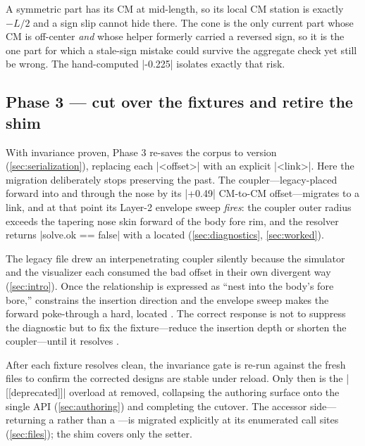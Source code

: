 \begin{keyinsight}
A symmetric part has its CM at mid-length, so its local CM station is exactly $-L/2$ and a sign
slip cannot hide there. The cone is the only current part whose CM is off-center \emph{and} whose
helper formerly carried a reversed sign, so it is the one part for which a stale-sign mistake
could survive the aggregate check yet still be wrong. The hand-computed
\cppinline|-0.225| isolates exactly that risk.
\end{keyinsight}

\subsection{Phase 3 --- cut over the fixtures and retire the shim}

With invariance proven, Phase 3 re-saves the corpus to version 
(\cref{sec:serialization}), replacing each \cppinline|<offset>| with an explicit
\cppinline|<link>|. Here the migration deliberately stops preserving the past. The
 coupler---legacy-placed forward into and through the nose by its
\cppinline|+0.49| CM-to-CM offset---migrates to a  link, and at that
point its Layer-2 envelope sweep \emph{fires}: the coupler outer radius exceeds the
tapering nose skin forward of the body fore rim, and the resolver returns
\cppinline|solve.ok == false| with a located 
(\cref{sec:diagnostics}, \cref{sec:worked}).

\begin{hardfail}
The legacy file drew an interpenetrating coupler silently because the simulator and the
visualizer each consumed the bad offset in their own divergent way (\cref{sec:intro}).
Once the relationship is expressed as ``nest into the body's fore bore,''
 constrains the insertion direction and the envelope sweep makes the
forward poke-through a hard, located \fail{}. The correct response is not to suppress
the diagnostic but to fix the fixture---reduce the insertion depth or shorten the
coupler---until it resolves \ok{}.
\end{hardfail}

After each fixture resolves clean, the invariance gate is re-run against the fresh
 files to confirm the corrected designs are stable under reload. Only then is
the \cppinline|[[deprecated]]| overload at  removed,
collapsing the authoring surface onto the single  API
(\cref{sec:authoring}) and completing the cutover. The accessor side---
returning a  rather than a ---is migrated explicitly at its
enumerated call sites (\cref{sec:files}); the shim covers only the setter.

